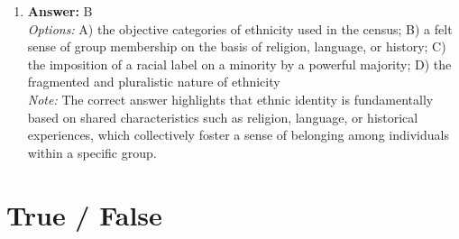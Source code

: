 \documentclass[12pt]{article}
\begin{document}
\begin{enumerate}[label=\arabic*.]
\item \textbf{Answer:} B
\\ \textit{Options:} A) the objective categories of ethnicity used in the census; B) a felt sense of group membership on the basis of religion, language, or history; C) the imposition of a racial label on a minority by a powerful majority; D) the fragmented and pluralistic nature of ethnicity
\\ \textit{Note:} The correct answer highlights that ethnic identity is fundamentally based on shared characteristics such as religion, language, or historical experiences, which collectively foster a sense of belonging among individuals within a specific group.
\end{enumerate}

\section*{True / False}
\end{document}
